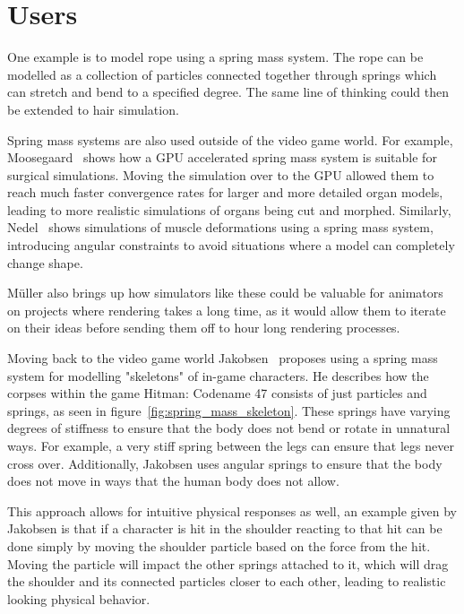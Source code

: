 \chapter{Users}
One example is to model rope using a spring mass system. The rope can be modelled as a collection of particles
connected together through springs which can stretch and bend to a specified degree.
The same line of thinking could then be extended to hair simulation.

Spring mass systems are also used outside of the video game world.
For example, Moosegaard~\cite{mosegaards_clothing_simulation} shows how a GPU accelerated spring mass system is suitable 
for surgical simulations. Moving the simulation over to the GPU allowed them to reach much faster convergence rates for
larger and more detailed organ models, leading to more realistic simulations of organs being cut and morphed.
Similarly, Nedel~\cite{nedel_muscle_spring_mass} shows simulations of muscle deformations using a spring mass system,
introducing angular constraints to avoid situations where a model can completely change shape.

Müller\cite{muller_fem} also brings up how simulators like these could be valuable for animators on projects where
rendering takes a long time, as it would allow them to iterate on their ideas before sending them off to hour long rendering processes.

Moving back to the video game world Jakobsen~\cite{jakobsen_advanced_character_physics} proposes using a spring mass system
for modelling "skeletons" of in-game characters. 
He describes how the corpses within the game Hitman: Codename 47 consists of just particles and springs, as seen in figure~\ref{fig:spring_mass_skeleton}.
These springs have varying degrees of stiffness to ensure that the body does not bend or rotate in unnatural ways.
For example, a very stiff spring between the legs can ensure that legs never cross over.
Additionally, Jakobsen uses angular springs to ensure that the body does not move in ways that the human body does not allow.

This approach allows for intuitive physical responses as well, an example given by Jakobsen is that if a character is hit in the shoulder
reacting to that hit can be done simply by moving the shoulder particle based on the force from the hit.
Moving the particle will impact the other springs attached to it, which will drag the shoulder and its connected particles closer to each other,
leading to realistic looking physical behavior.

